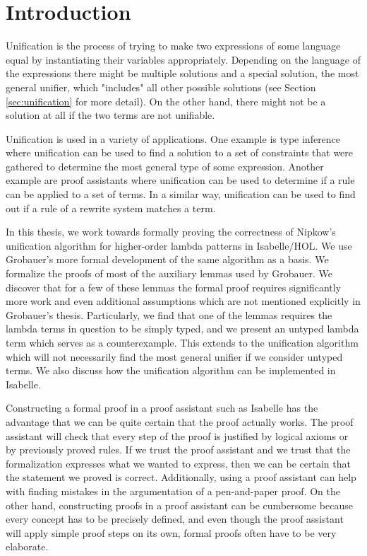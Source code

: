 \chapter{Introduction}

Unification is the process of trying to make two expressions of some language equal by instantiating their variables appropriately. Depending on the language of the expressions there might be multiple solutions and a special solution, the most general unifier, which "includes" all other possible solutions (see Section \ref{sec:unification} for more detail). On the other hand, there might not be a solution at all if the two terms are not unifiable.

Unification is used in a variety of applications. One example is type inference where unification can be used to find a solution to a set of constraints that were gathered to determine the most general type of some expression. Another example are proof assistants where unification can be used to determine if a rule can be applied to a set of terms. In a similar way, unification can be used to find out if a rule of a rewrite system matches a term.

In this thesis, we work towards formally proving the correctness of Nipkow's unification algorithm for higher-order lambda patterns \cite{Nipkow-LICS-93} in Isabelle\slash HOL. We use Grobauer's more formal development of the same algorithm \cite{Grobauer} as a basis. We formalize the proofs of most of the auxiliary lemmas used by Grobauer. We discover that for a few of these lemmas the formal proof requires significantly more work and even additional assumptions which are not mentioned explicitly in Grobauer's thesis. Particularly, we find that one of the lemmas requires the lambda terms in question to be simply typed, and we present an untyped lambda term which serves as a counterexample. This extends to the unification algorithm which will not necessarily find the most general unifier if we consider untyped terms. We also discuss how the unification algorithm can be implemented in Isabelle.

Constructing a formal proof in a proof assistant such as Isabelle has the advantage that we can be quite certain that the proof actually works. The proof assistant will check that every step of the proof is justified by logical axioms or by previously proved rules. If we trust the proof assistant and we trust that the formalization expresses what we wanted to express, then we can be certain that the statement we proved is correct. Additionally, using a proof assistant can help with finding mistakes in the argumentation of a pen-and-paper proof. On the other hand, constructing proofs in a proof assistant can be cumbersome because every concept has to be precisely defined, and even though the proof assistant will apply simple proof steps on its own, formal proofs often have to be very elaborate.

